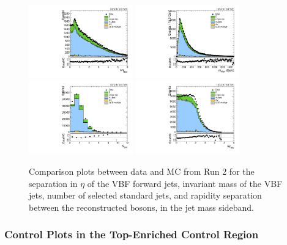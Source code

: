 \begin{figure}[htbp]
  \centering
  \includegraphics[width=0.4\textwidth]{fig/analysis/SB_b1_allL_allP_allC_allE_Run2_lnujj_vbfDEta.pdf}
  \includegraphics[width=0.4\textwidth]{fig/analysis/SB_b1_allL_allP_allC_allE_Run2_lnujj_vbfMass.pdf}\\
  \includegraphics[width=0.4\textwidth]{fig/analysis/SB_b1_allL_allP_allC_allE_Run2_lnujj_nJets.pdf}
  \includegraphics[width=0.4\textwidth]{fig/analysis/SB_b1_allL_allP_allC_allE_Run2_dy.pdf}\\
  \caption{
    Comparison plots between data and MC from Run 2 for the separation in $\eta$ of the VBF forward jets, invariant mass of the VBF jets, number of selected standard jets, and rapidity separation between the reconstructed bosons, in the jet mass sideband.
  }
  \label{fig:SB_controlPlotsRun2_4}
\end{figure}

\subsubsection{Control Plots in the Top-Enriched Control Region}

